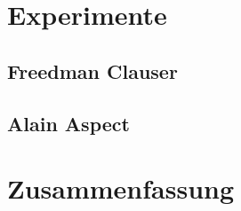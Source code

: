 \begin{refsection}
\section{Experimente}
\subsection{Freedman Clauser}
\subsection{Alain Aspect}

\section{Zusammenfassung}


\printbibliography[heading=subbibliography]
\end{refsection}

